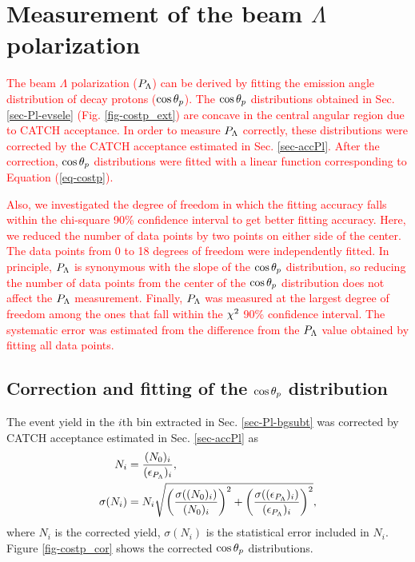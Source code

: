 \clearpage
\section{Measurement of the beam $\Lambda$ polarization}
\label{sec-Plmeas}

\textcolor{red}{ The beam $\Lambda$ polarization ($P_{\Lambda}$) can be derived by fitting the emission angle distribution of decay protons ($\cos{\theta_p}$). The $\cos{\theta_p}$ distributions obtained in Sec. \ref{sec-Pl-evsele} (Fig. \ref{fig-costp_ext}) are concave in the central angular region due to CATCH acceptance. In order to measure $P_{\Lambda}$ correctly, these distributions were corrected by the CATCH acceptance estimated in Sec. \ref{sec-accPl}. After the correction, $\cos{\theta_p}$ distributions were fitted with a linear function corresponding to Equation (\ref{eq-costp}). }

\textcolor{red}{ Also, we investigated the degree of freedom in which the fitting accuracy falls within the chi-square 90\% confidence interval to get better fitting accuracy. Here, we reduced the number of data points by two points on either side of the center. The data points from 0 to 18 degrees of freedom were independently fitted. In principle, $P_{\Lambda}$ is synonymous with the slope of the $\cos{\theta_p}$ distribution, so reducing the number of data points from the center of the $\cos{\theta_p}$ distribution does not affect the $P_{\Lambda}$ measurement. Finally, $P_{\Lambda}$ was measured at the largest degree of freedom among the ones that fall within the $\chi^{2}$ 90\% confidence interval. The systematic error was estimated from the difference from the $P_{\Lambda}$ value obtained by fitting all data points. }

\subsection{Correction and fitting of the $\cos{\theta_p}$ distribution}
\label{subsec-corcostp}

The event yield in the $i$th bin extracted in Sec. \ref{sec-Pl-bgsubt} was corrected by CATCH acceptance estimated in Sec. \ref{sec-accPl} as
\begin{align}
  N_i &= \frac{(N_{0})_i}{(\epsilon_{P_{\Lambda}})_i}, \\
  \sigma(N_i) &= N_i \sqrt{\left( \frac{\sigma((N_{0})_i)}{(N_{0})_i} \right)^2 +\left( \frac{\sigma((\epsilon_{P_{\Lambda}})_i)}{(\epsilon_{P_{\Lambda}})_i} \right)^2 },  \label{eq-errNcor} \\
\end{align}
where $N_i$ is the corrected yield, $\sigma(N_i)$ is the statistical error included in $N_i$. Figure \ref{fig-costp_cor} shows the corrected $\cos{\theta_p}$ distributions.

